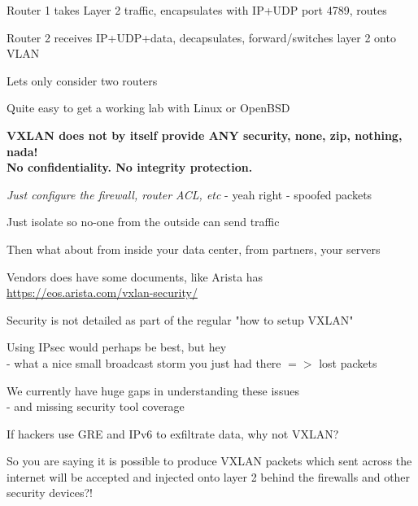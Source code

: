 \documentclass[Screen16to9,17pt,footrule]{foils}
\begin{document}
\begin{list2}
\item Router 1 takes Layer 2 traffic, encapsulates with IP+UDP port 4789, routes
\item Router 2 receives IP+UDP+data, decapsulates, forward/switches layer 2 onto VLAN
\item Lets only consider two routers
\end{list2}

\centerline{Quite easy to get a working lab with Linux or OpenBSD \smiley}


{\bf VXLAN does not by itself provide ANY security, none, zip, nothing, nada! \\
No confidentiality. No integrity protection.}



\begin{list2}
\item \emph{Just configure the firewall, router ACL, etc} - yeah right - spoofed packets
\item Just isolate so no-one from the outside can send traffic
\item Then what about from inside your data center, from partners, your servers
\item Vendors does have some documents, like Arista has\\ \url{https://eos.arista.com/vxlan-security/}
\item Security is not detailed as part of the regular "how to setup VXLAN"
\item Using IPsec would perhaps be best, but hey \\
- what a nice small broadcast storm you just had there $=>$ lost packets
\end{list2}


\vskip 1cm
We currently have huge gaps in understanding these issues\\
- and missing security tool coverage

\vskip 5mm

{\small If hackers use GRE and IPv6 to exfiltrate data, why not VXLAN?}


\vskip 2cm
So you are saying it is possible to produce VXLAN packets which sent across the internet will be accepted and injected onto layer 2 behind the firewalls and other security devices?!
\end{document}
